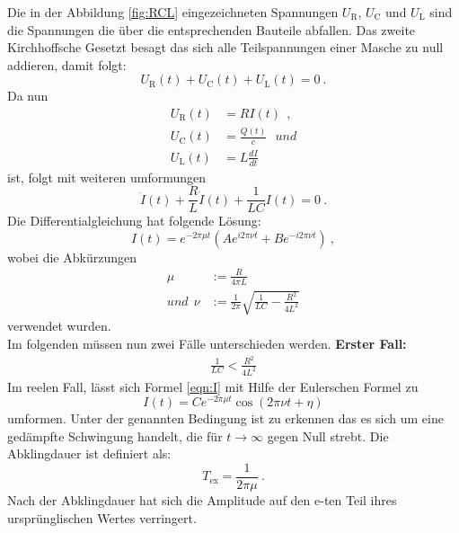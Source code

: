 Die in der Abbildung \ref{fig:RCL} eingezeichneten Spannungen $U_\text{R}$, $U_\text{C}$ und $U_\text{L}$ sind die Spannungen die über die entsprechenden Bauteile abfallen. Das zweite Kirchhoffsche Gesetzt besagt das sich alle Teilspannungen einer Masche zu null addieren, damit folgt:
\begin{equation}
	U_\text{R}(t) + U_\text{C}(t) + U_\text{L}(t) = 0 \ .
\end{equation}
Da nun
\begin{align*}
	U_\text{R}(t) &= R I(t) \ \ , \\
	U_\text{C}(t) &= \frac{Q(t)}{c} \ \ \ und \\
	U_\text{L}(t) &= L \frac{d I}{d t}
\end{align*}
ist, folgt mit weiteren umformungen
\begin{equation}
	\ddot{I}(t) + \frac{R}{L} \dot{I}(t) + \frac{1}{LC} I(t) = 0 \ .
\end{equation}
Die Differentialgleichung hat folgende Lösung:
\begin{equation}
	I(t) = e^{-2 \pi \mu t} \left(A e^{i2 \pi \nu t} + B e^{-i2 \pi \nu t} \right) \ ,
	\label{eqn:I}
\end{equation}
wobei die Abkürzungen
\begin{align*}
	\mu & := \frac{R}{4 \pi L} \\
	und \ \ \nu & := \frac{1}{2 \pi} \sqrt{\frac{1}{LC} - \frac{R^2}{4L^2}}
\end{align*}
verwendet wurden. \\
Im folgenden müssen nun zwei Fälle unterschieden werden.
\newline
\newline
\textbf{Erster Fall:}
\begin{align*}
	\frac{1}{LC} < \frac{R^2}{4L^2}
\end{align*}
Im reelen Fall, lässt sich Formel \ref{eqn:I} mit Hilfe der Eulerschen Formel zu
\begin{equation}
	I(t) = C e^{-2 \pi \mu t} \cos(2 \pi \nu t + \eta)
\end{equation}
umformen. Unter der genannten Bedingung ist zu erkennen das es sich um eine gedämpfte Schwingung handelt, die für $t \to \infty$ gegen Null strebt. Die Abklingdauer ist definiert als:
\begin{equation}
	T_\text{ex} = \frac{1}{2 \pi \mu} \ .
\end{equation}
Nach der Abklingdauer hat sich die Amplitude auf den e-ten Teil ihres ursprünglischen Wertes verringert.
\newline
